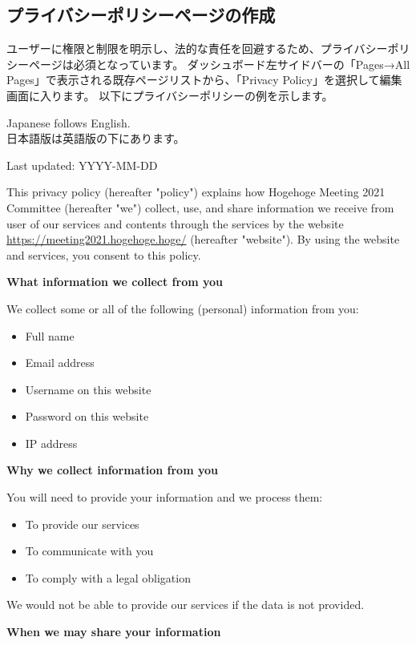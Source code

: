 \documentclass[titlepage,10pt,a4paper,uplatex]{jsbook}
\newenvironment{content}{\begin{shaded}\vspace{-1em}\raggedright\ttfamily\footnotesize\setlength{\baselineskip}{1.4em}}{\end{shaded}\vspace{-1em}}
\renewcommand{\textbf}[1]{{\bfseries\sffamily#1}}
\begin{document}
\subsection{プライバシーポリシーページの作成}

ユーザーに権限と制限を明示し、法的な責任を回避するため、プライバシーポリシーページは必須となっています。
ダッシュボード左サイドバーの「Pages→All Pages」で表示される既存ページリストから、「Privacy Policy」を選択して編集画面に入ります。
以下にプライバシーポリシーの例を示します。

\begin{content}
Japanese follows English.\\
日本語版は英語版の下にあります。

Last updated: YYYY-MM-DD

This privacy policy (hereafter "policy") explains how Hogehoge Meeting 2021 Committee (hereafter "we") collect, use, and share information we receive from user of our services and contents through the services by the website \url{https://meeting2021.hogehoge.hoge/} (hereafter "website"). By using the website and services, you consent to this policy.

\textbf{\Large What information we collect from you}

We collect some or all of the following (personal) information from you:

\begin{itemize}
\item Full name
\item Email address
\item Username on this website
\item Password on this website
\item IP address
\end{itemize}

\textbf{\Large Why we collect information from you}

You will need to provide your information and we process them:

\begin{itemize}
\item To provide our services
\item To communicate with you
\item To comply with a legal obligation
\end{itemize}

We would not be able to provide our services if the data is not provided.

\textbf{\Large When we may share your information}


\end{content}
\end{document}
